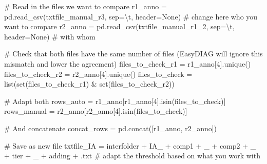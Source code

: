 \documentclass[
  letterpaper,
  DIV=11,
  numbers=noendperiod]{scrreprt}
\newenvironment{Shaded}{\begin{snugshade}}{\end{snugshade}}
\newcommand{\BuiltInTok}[1]{\textcolor[rgb]{0.00,0.23,0.31}{#1}}
\newcommand{\CharTok}[1]{\textcolor[rgb]{0.13,0.47,0.30}{#1}}
\newcommand{\CommentTok}[1]{\textcolor[rgb]{0.37,0.37,0.37}{#1}}
\newcommand{\DecValTok}[1]{\textcolor[rgb]{0.68,0.00,0.00}{#1}}
\newcommand{\NormalTok}[1]{\textcolor[rgb]{0.00,0.23,0.31}{#1}}
\newcommand{\OperatorTok}[1]{\textcolor[rgb]{0.37,0.37,0.37}{#1}}
\newcommand{\StringTok}[1]{\textcolor[rgb]{0.13,0.47,0.30}{#1}}
\newcommand{\VariableTok}[1]{\textcolor[rgb]{0.07,0.07,0.07}{#1}}
\begin{document}
\begin{Shaded}
\begin{Highlighting}[]
    \CommentTok{\# Read in the files we want to compare}
\NormalTok{    r1\_anno }\OperatorTok{=}\NormalTok{ pd.read\_csv(txtfile\_manual\_r3, sep}\OperatorTok{=}\StringTok{\textquotesingle{}}\CharTok{\textbackslash{}t}\StringTok{\textquotesingle{}}\NormalTok{, header}\OperatorTok{=}\VariableTok{None}\NormalTok{)         }\CommentTok{\# change here who you want to compare}
\NormalTok{    r2\_anno }\OperatorTok{=}\NormalTok{ pd.read\_csv(txtfile\_manual\_r1\_2, sep}\OperatorTok{=}\StringTok{\textquotesingle{}}\CharTok{\textbackslash{}t}\StringTok{\textquotesingle{}}\NormalTok{, header}\OperatorTok{=}\VariableTok{None}\NormalTok{)    }\CommentTok{\# with whom}
 
    \CommentTok{\# Check that both files have the same number of files (EasyDIAG will ignore this mismatch and lower the agreement)}
\NormalTok{    files\_to\_check\_r1 }\OperatorTok{=}\NormalTok{ r1\_anno[}\DecValTok{4}\NormalTok{].unique()}
\NormalTok{    files\_to\_check\_r2 }\OperatorTok{=}\NormalTok{ r2\_anno[}\DecValTok{4}\NormalTok{].unique()}
\NormalTok{    files\_to\_check }\OperatorTok{=} \BuiltInTok{list}\NormalTok{(}\BuiltInTok{set}\NormalTok{(files\_to\_check\_r1) }\OperatorTok{\&} \BuiltInTok{set}\NormalTok{(files\_to\_check\_r2))}

    \CommentTok{\# Adapt both}
\NormalTok{    rows\_auto }\OperatorTok{=}\NormalTok{ r1\_anno[r1\_anno[}\DecValTok{4}\NormalTok{].isin(files\_to\_check)]}
\NormalTok{    rows\_manual }\OperatorTok{=}\NormalTok{ r2\_anno[r2\_anno[}\DecValTok{4}\NormalTok{].isin(files\_to\_check)]}

    \CommentTok{\# And concatenate}
\NormalTok{    concat\_rows }\OperatorTok{=}\NormalTok{ pd.concat([r1\_anno, r2\_anno])}

    \CommentTok{\# Save as new file}
\NormalTok{    txtfile\_IA }\OperatorTok{=}\NormalTok{ interfolder }\OperatorTok{+} \StringTok{\textquotesingle{}IA\_\textquotesingle{}} \OperatorTok{+}\NormalTok{ comp1 }\OperatorTok{+} \StringTok{\textquotesingle{}\_\textquotesingle{}} \OperatorTok{+}\NormalTok{ comp2 }\OperatorTok{+} \StringTok{\textquotesingle{}\_\textquotesingle{}} \OperatorTok{+}\NormalTok{ tier }\OperatorTok{+} \StringTok{\textquotesingle{}\_\textquotesingle{}} \OperatorTok{+}\NormalTok{ adding }\OperatorTok{+} \StringTok{\textquotesingle{}.txt\textquotesingle{}} \CommentTok{\# adapt the threshold based on what you work with}


\end{Highlighting}
\end{Shaded}
\end{document}
